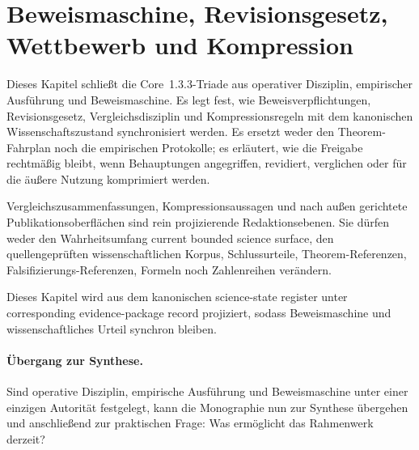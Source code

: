 \section{Beweismaschine, Revisionsgesetz, Wettbewerb und Kompression}
\label{sec:oc-core-1-3-proof-machinery-de}

Dieses Kapitel schließt die Core~1.3.3-Triade aus operativer Disziplin,
empirischer Ausführung und Beweismaschine. Es legt fest, wie
Beweisverpflichtungen, Revisionsgesetz, Vergleichsdisziplin und
Kompressionsregeln mit dem kanonischen Wissenschaftszustand synchronisiert
werden. Es ersetzt weder den Theorem-Fahrplan noch die empirischen
Protokolle; es erläutert, wie die Freigabe rechtmäßig bleibt, wenn Behauptungen
angegriffen, revidiert, verglichen oder für die äußere Nutzung komprimiert
werden.

Vergleichszusammenfassungen, Kompressionsaussagen und nach außen gerichtete
Publikationsoberflächen sind rein projizierende Redaktionsebenen. Sie dürfen
weder den Wahrheitsumfang current bounded science surface, den quellengeprüften
wissenschaftlichen Korpus, Schlussurteile, Theorem-Referenzen,
Falsifizierungs-Referenzen, Formeln noch Zahlenreihen verändern.

Dieses Kapitel wird aus dem kanonischen science-state register
 unter
corresponding evidence-package record
projiziert, sodass Beweismaschine und wissenschaftliches Urteil synchron
bleiben.



\paragraph{Übergang zur Synthese.}
Sind operative Disziplin, empirische Ausführung und Beweismaschine unter
einer einzigen Autorität festgelegt, kann die Monographie nun zur Synthese
übergehen und anschließend zur praktischen Frage: Was ermöglicht das
Rahmenwerk derzeit?
